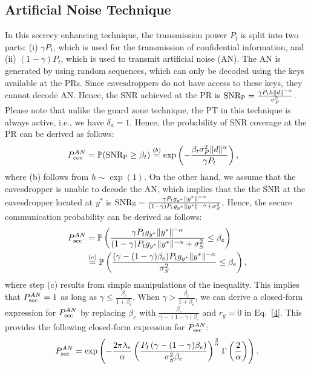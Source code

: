 \documentclass[final]{IEEEtran}
\begin{document}
\subsection{Artificial Noise Technique}
\vspace{-2mm}
In this secrecy enhancing technique, the transmission power $P_t$ is split into two parts: (i) $\gamma P_t$, which is used for the transmission of confidential information, and (ii) $(1-\gamma)P_t$, which is used to transmit artificial noise (AN). The AN is generated by using random sequences, which can only be decoded using the keys available at the PRs. Since eavesdroppers do not have access to these keys, they cannot decode AN. Hence, the SNR achieved at the PR is ${\rm SNR_P}=\frac{\gamma P_th\|d\|^{-\alpha}}{\sigma_P^2}$. Please note that unlike the guard zone technique, the PT in this technique is always active, i.e., we have $\delta_a=1$. Hence, the probability of SNR coverage at the PR can be derived as follows:
\begin{align}
\label{5}
P_{\rm cov}^{AN}&=\mathbb{P}({\rm SNR_P}\geq\beta_t)\stackrel{(b)}{=}\exp\left(-\frac{\beta_t\sigma^2_P\|d\|^{\alpha}}{\gamma P_t}\right),
\end{align}
where (b) follows from $h\sim \exp(1)$. On the other hand, we assume that the eavesdropper is unable to decode the AN, which implies that the the SNR at the eavesdropper located at $y^{*}$ is ${\rm SNR_S}=\frac{\gamma P_tg_{y^{*}}\|y^{*}\|^{-\alpha}}{(1-\gamma)P_tg_{y^{*}}\|y^{*}\|^{-\alpha}+\sigma_S^2}$. Hence, the secure communication probability can be derived as follows:
\begin{align}
\label{6}
P_{\rm sec}^{AN}&=\mathbb{P}\left(\frac{\gamma P_tg_{y^{*}}\|y^{*}\|^{-\alpha}}{(1-\gamma)P_tg_{y^{*}}\|y^{*}\|^{-\alpha}+\sigma_S^2}\leq\beta_e\right)\\
&\stackrel{(c)}{=}\mathbb{P}\left(\frac{ {\left(\gamma-(1-\gamma)\beta_e\right)}P_tg_{y^{*}}\|y^{*}\|^{-\alpha}}{\sigma_S^2}\leq{\beta_e}\right)\nonumber,
\end{align}
where step (c) results from simple manipulations of the inequality. This implies that $P_{\rm sec}^{AN}=1$ as long as $\gamma\leq\frac{\beta_e}{1+\beta_e}$. When $\gamma > \frac{\beta_e}{1+\beta_e}$, we can derive a closed-form expression for $P_{\rm sec}^{AN}$ by replacing $\beta_e$ with $\frac{\beta_e}{\gamma-(1-\gamma)\beta_e}$ and $r_g=0$ in Eq.~\ref{4}. This provides the following closed-form expression for $P_{\rm sec}^{AN}$:
\begin{align}
\label{7}
P_{\rm sec}^{AN}=\exp\left(-\frac{2\pi\lambda_e}{\alpha}\left(\frac{P_{t}\left({\gamma-(1-\gamma)\beta_e}\right)}{\sigma_S^2\beta_e}\right)^{\frac{2}{\alpha}}\Gamma\left(\frac{2}{\alpha}\right)\right).
\end{align}
\end{document}
